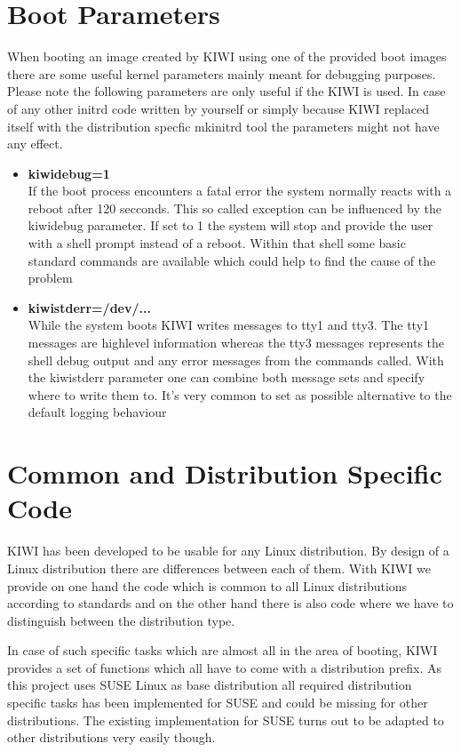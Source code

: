 \section{Boot Parameters}
When booting an image created by KIWI using one of the provided
boot images there are some useful kernel parameters mainly meant
for debugging purposes. Please note the following parameters are
only useful if the KIWI  is used. In case of any other
initrd code written by yourself or simply because KIWI replaced
itself with the distribution specfic mkinitrd tool the parameters
might not have any effect.

\begin{itemize}
\item \textbf{kiwidebug=1}\\
      If the boot process encounters a fatal error the system normally
      reacts with a reboot after 120 secconds. This so called exception
      can be influenced by the kiwidebug parameter. If set to 1 the system
      will stop and provide the user with a shell prompt instead of a
      reboot. Within that shell some basic standard commands are
      available which could help to find the cause of the problem
\item \textbf{kiwistderr=/dev/...}\\
      While the system boots KIWI writes messages to tty1 and tty3. The
      tty1 messages are highlevel information whereas the tty3 messages
      represents the shell debug output and any error messages from
      the commands called. With the kiwistderr parameter one can combine
      both message sets and specify where to write them to. It's very
      common to set  as possible alternative to the default
      logging behaviour
\end{itemize}

\section{Common and Distribution Specific Code}
KIWI has been developed to be usable for any Linux distribution.
By design of a Linux distribution there are differences between
each of them. With KIWI we provide on one hand the code which
is common to all Linux distributions according to standards and
on the other hand there is also code where we have to distinguish
between the distribution type.

In case of such specific tasks which are almost all in the area
of booting, KIWI provides a set of functions which all have to come
with a distribution prefix. As this project uses SUSE Linux as
base distribution all required distribution specific tasks has been
implemented for SUSE and could be missing for other distributions.
The existing implementation for SUSE turns out to be adapted to other
distributions very easily though.

